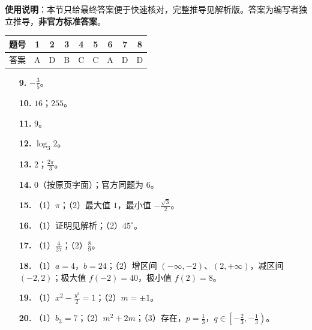 
\begin{gknotice}
\textbf{使用说明}：本节只给最终答案便于快速核对，完整推导见解析版。答案为编写者独立推导，\textbf{非官方标准答案}。
\end{gknotice}

\begin{center}\begin{tabular}{ccccccccc}
\toprule
题号 & 1 & 2 & 3 & 4 & 5 & 6 & 7 & 8 \\
\midrule
答案 & A & D & B & C & C & A & D & D \\
\bottomrule
\end{tabular}\end{center}

\begin{itemize}[leftmargin=2.6em]
  \item[\textbf{9.}] $-\frac35$。
  \item[\textbf{10.}] $16$；$255$。
  \item[\textbf{11.}] $9$。
  \item[\textbf{12.}] $\log_3 2$。
  \item[\textbf{13.}] $2$；$\frac{2\pi}{3}$。
  \item[\textbf{14.}] 0（按原页字面）；官方同题为 6。
\end{itemize}

\begin{itemize}[leftmargin=2.6em]
  \item[\textbf{15.}] （1）$\pi$；（2）最大值 $1$，最小值 $-\frac{\sqrt3}{2}$。
  \item[\textbf{16.}] （1）证明见解析；（2）$45^\circ$。
  \item[\textbf{17.}] （1）$\frac4{27}$；（2）$\frac89$。
  \item[\textbf{18.}] （1）$a=4$，$b=24$；（2）增区间 $(-\infty,-2)$、$(2,+\infty)$，减区间 $(-2,2)$；极大值 $f(-2)=40$，极小值 $f(2)=8$。
  \item[\textbf{19.}] （1）$x^2-\frac{y^2}{2}=1$；（2）$m=\pm1$。
  \item[\textbf{20.}] （1）$b_3=7$；（2）$m^2+2m$；（3）存在，$p=\frac13$，$q\in\left[-\frac23,-\frac13\right)$。
\end{itemize}
